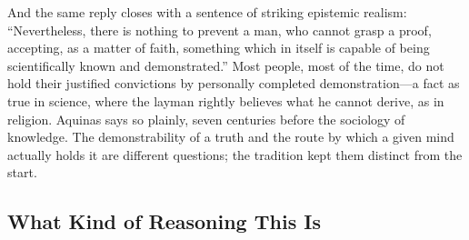 And the same reply closes with a sentence of striking epistemic realism: ``Nevertheless, there is nothing to prevent a man, who cannot grasp a proof, accepting, as a matter of faith, something which in itself is capable of being scientifically known and demonstrated.'' Most people, most of the time, do not hold their justified convictions by personally completed demonstration---a fact as true in science, where the layman rightly believes what he cannot derive, as in religion. Aquinas says so plainly, seven centuries before the sociology of knowledge. The demonstrability of a truth and the route by which a given mind actually holds it are different questions; the tradition kept them distinct from the start.

\subsection{What Kind of Reasoning This Is}

